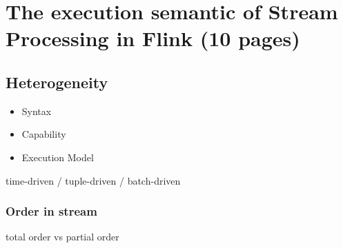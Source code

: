 
\chapter{The execution semantic of Stream Processing in Flink (10 pages)}

\ifpdf
    \graphicspath{{Chapter3/Figs/Raster/}{Chapter3/Figs/PDF/}{Chapter3/Figs/}}
\else
    \graphicspath{{Chapter3/Figs/Vector/}{Chapter3/Figs/}}
\fi

\section{Heterogeneity}\citep{Dindar:2013}
\begin{itemize}
	\item Syntax
	\item Capability
	\item Execution Model
\end{itemize}

time-driven / tuple-driven / batch-driven
 
\subsection*{Order in stream}
total order vs partial order






